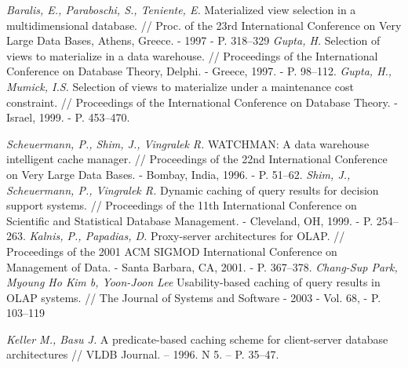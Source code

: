 \begin{thebibliography}{9}
  \textit{Baralis, E., Paraboschi, S., Teniente, E.} Materialized view selection in a multidimensional database.
  // Proc. of the 23rd International Conference on Very Large Data Bases,
  Athens, Greece.
  - 1997
  - P. 318–329
  \textit{Gupta, H.}
  Selection of views to materialize in a data warehouse.
  // Proceedings of the International Conference on Database Theory, Delphi.
  - Greece, 1997.
  - P. 98–112.
  \textit{Gupta, H., Mumick, I.S.}
  Selection of views to materialize under a maintenance cost constraint.
  // Proceedings of the International Conference on Database Theory.
  - Israel, 1999.
  - P. 453–470.

  \textit{Scheuermann, P., Shim, J., Vingralek R.}
  WATCHMAN: A data warehouse intelligent cache manager.
  // Proceedings of the 22nd International Conference on Very Large Data Bases.
  - Bombay, India, 1996.
  - P. 51–62.
  \textit{Shim, J., Scheuermann, P., Vingralek R.}
  Dynamic caching of query results for decision support systems.
  // Proceedings of the 11th International Conference on Scientific and
  Statistical Database Management.
  - Cleveland, OH, 1999.
  - P. 254–263.
  \textit{Kalnis, P., Papadias, D.}
  Proxy-server architectures for OLAP.
  // Proceedings of the 2001 ACM SIGMOD International Conference on Management
  of Data.
  - Santa Barbara, CA, 2001.
  - P. 367–378.
  \textit{Chang-Sup Park, Myoung Ho Kim b, Yoon-Joon Lee}
  Usability-based caching of query results in OLAP systems.
  // The Journal of Systems and Software
  - 2003
  - Vol. 68, - P. 103–119

  \textit{Keller M., Basu J.}
  A predicate-based caching scheme for client-server database architectures
  // VLDB Journal. – 1996. N 5. – P. 35–47.
  
  
\end{thebibliography}
